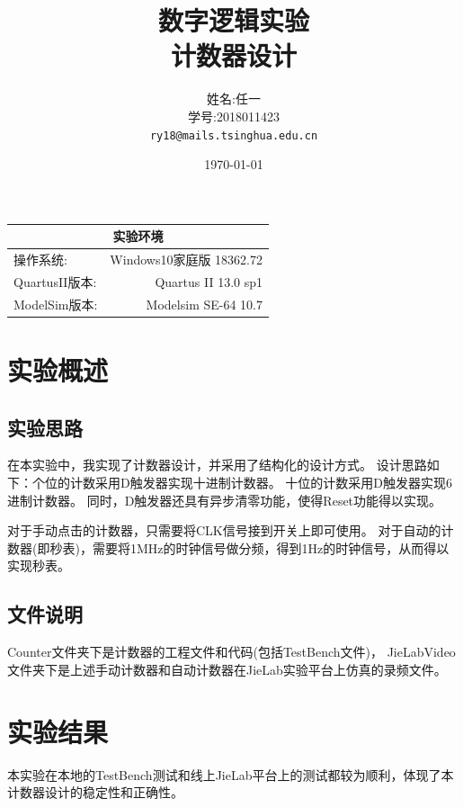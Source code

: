 \documentclass[UTF8]{article}
\title{数字逻辑实验 \\ 计数器设计} %
\author{姓名:任一  \\学号:2018011423\\ \texttt{ry18@mails.tsinghua.edu.cn}} %
\date{\today} %
\begin{document}
\maketitle %
\begin{center}
    \begin{tabular}{l  r}
    \hline

        \multicolumn{2}{c}{实验环境} \\ \hline
        操作系统: & Windows10家庭版 18362.72 \\ \hline%
        QuartusII版本: & Quartus II 13.0 sp1 \\ \hline%

        ModelSim版本: & Modelsim SE-64 10.7 \\ \hline%

    \end{tabular}
\end{center}
\newpage


\section{实验概述}
\subsection{实验思路}
在本实验中，我实现了计数器设计，并采用了结构化的设计方式。
设计思路如下：个位的计数采用D触发器实现十进制计数器。
十位的计数采用D触发器实现6进制计数器。
同时，D触发器还具有异步清零功能，使得Reset功能得以实现。

对于手动点击的计数器，只需要将CLK信号接到开关上即可使用。
对于自动的计数器(即秒表)，需要将1MHz的时钟信号做分频，得到1Hz的时钟信号，从而得以实现秒表。


\subsection{文件说明}
Counter文件夹下是计数器的工程文件和代码(包括TestBench文件)，
JieLabVideo文件夹下是上述手动计数器和自动计数器在JieLab实验平台上仿真的录频文件。


\section{实验结果}
本实验在本地的TestBench测试和线上JieLab平台上的测试都较为顺利，体现了本计数器设计的稳定性和正确性。
\end{document}
